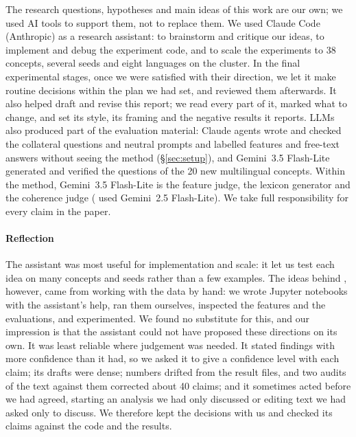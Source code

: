 The research questions, hypotheses and main ideas of this work are our own; we used AI tools to support them, not to replace them.
We used Claude Code (Anthropic) as a research assistant: to brainstorm and critique our ideas, to implement and debug the experiment code, and to scale the experiments to 38 concepts, several seeds and eight languages on the cluster.
In the final experimental stages, once we were satisfied with their direction, we let it make routine decisions within the plan we had set, and reviewed them afterwards.
It also helped draft and revise this report; we read every part of it, marked what to change, and set its style, its framing and the negative results it reports.
LLMs also produced part of the evaluation material: Claude agents wrote and checked the collateral questions and neutral prompts and labelled features and free-text answers without seeing the method (\S\ref{sec:setup}), and Gemini~3.5 Flash-Lite generated and verified the questions of the 20 new multilingual concepts.
Within the method, Gemini~3.5 Flash-Lite is the feature judge, the lexicon generator and the coherence judge (\ember{} used Gemini~2.5 Flash-Lite).
We take full responsibility for every claim in the paper.

\paragraph{Reflection}
The assistant was most useful for implementation and scale: it let us test each idea on many concepts and seeds rather than a few examples.
The ideas behind \cinder{}, however, came from working with the data by hand: we wrote Jupyter notebooks with the assistant's help, ran them ourselves, inspected the features and the evaluations, and experimented.
We found no substitute for this, and our impression is that the assistant could not have proposed these directions on its own.
It was least reliable where judgement was needed.
It stated findings with more confidence than it had, so we asked it to give a confidence level with each claim; its drafts were dense; numbers drifted from the result files, and two audits of the text against them corrected about 40 claims; and it sometimes acted before we had agreed, starting an analysis we had only discussed or editing text we had asked only to discuss.
We therefore kept the decisions with us and checked its claims against the code and the results.
